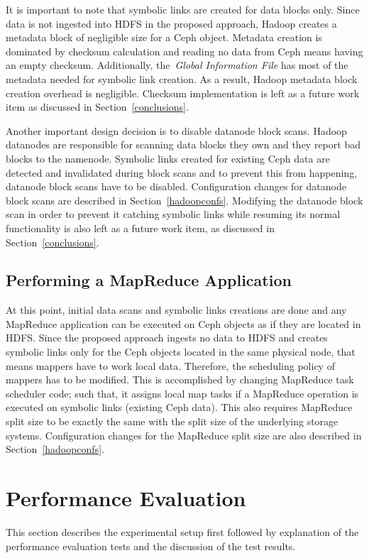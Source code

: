 \documentclass[preprint,12pt]{elsarticle}
\begin{document}
It is important to note that symbolic links are created for data blocks only. Since data is not ingested
into HDFS in the proposed approach, Hadoop creates a metadata block of negligible size for a Ceph object.
Metadata creation is dominated by checksum calculation and reading no data from Ceph means having an empty
checksum. Additionally, the~\textit{Global Information File} has most of the metadata needed for symbolic link
creation. As a result, Hadoop metadata block creation overhead is negligible. Checksum implementation is left
as a future work item as discussed in Section~\ref{conclusions}.

Another important design decision is to disable datanode
block scans. Hadoop datanodes are responsible for scanning data blocks they own and they report bad
blocks to the namenode. Symbolic links created for existing Ceph data are detected and invalidated during block scans
and to prevent this from happening, datanode block scans have to be disabled. Configuration changes for
datanode block scans are described in Section~\ref{hadoopconfs}. Modifying the datanode block scan in order to
prevent it catching symbolic links while resuming its normal functionality is also left as a future work item,
as discussed in Section~\ref{conclusions}.

\subsection{Performing a MapReduce Application}
At this point, initial data scans and symbolic links creations are done and any MapReduce application can be executed
on Ceph objects as if they are located in HDFS. Since the proposed approach ingests no data to HDFS and creates
symbolic links only for the Ceph objects located in the same physical node, that means mappers have to work local
data. Therefore, the scheduling policy of mappers has to be modified. This is accomplished by changing
MapReduce task scheduler code; such that, it assigns local map tasks if a MapReduce operation is executed on
symbolic links (existing Ceph data). This also requires MapReduce split size to be exactly the same with the split
size of the underlying storage systems. Configuration changes for the MapReduce split size are also described in
Section~\ref{hadoopconfs}.

\section{Performance Evaluation}
\label{sec-performance}
\label{results}
This section describes the experimental setup first followed by explanation of the
performance evaluation tests and the discussion of the test results.
\end{document}
